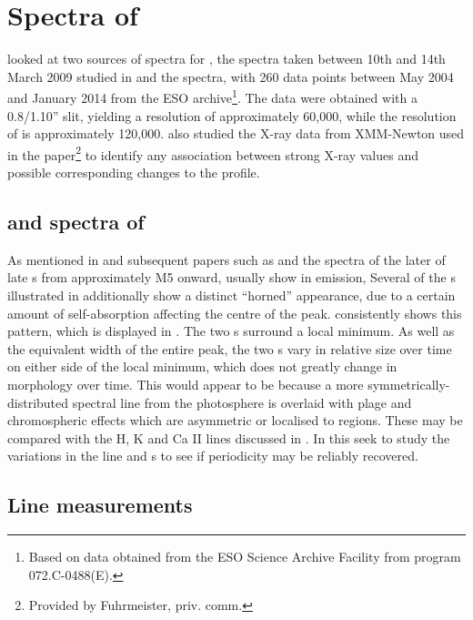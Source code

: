 \chapter{Spectra of \prox} %
\protect\label{chapter:proxima}

{\FirstP} looked at two sources of spectra for \prox, the {\uves} spectra taken between 10th and 14th March 2009 studied
in \citet{fuhrmeister11} and the {\harps} spectra, with 260 data points between May 2004 and January 2014 from the ESO
archive\footnote{Based on data obtained from the ESO Science Archive Facility from program 072.C-0488(E).}. The {\uves}
data were obtained with a 0.8/1.10'' slit, yielding a resolution of approximately 60,000, while the resolution of
{\harps} is approximately 120,000. {\FirstP} also studied the X-ray data from XMM-Newton used in the
\citet{fuhrmeister11} paper\footnote{Provided by Fuhrmeister, priv. comm.} to identify any association between strong
X-ray values and possible corresponding changes to the {\ha} profile.

\section{{\harps} and {\uves} spectra of \prox}

As mentioned in \citet{mohanty03} and subsequent papers such as \citet{jenkins09} and \citet{barnes14} the spectra of
the later of late \rdwarf s from approximately M5 onward, usually show {\ha} in emission, Several of the \rdwarf s
illustrated in \citet[Fig. 6]{barnes14} additionally show a distinct ``horned'' appearance, due to a certain amount of
self-absorption affecting the centre of the {\ha} peak. {\prox} consistently shows this pattern, which is displayed in
\citet[Fig. 14]{fuhrmeister11}. The two \horn s surround a local minimum. As well as the equivalent width of the entire
{\ha} peak, the two \horn s vary in relative size over time on either side of the local minimum, which does not greatly
change in morphology over time. This would appear to be because a more symmetrically-distributed spectral line from the
photosphere is overlaid with plage and chromospheric effects which are asymmetric or localised to regions. These may be
compared with the H, K and Ca II lines discussed in \citet{rauscher06}. In this {\paperorthesis} {\Firstp} seek to study
the variations in the line and \horn s to see if periodicity may be reliably recovered.

\section{{\ha} Line measurements}
\protect\label{section:linemeas}


